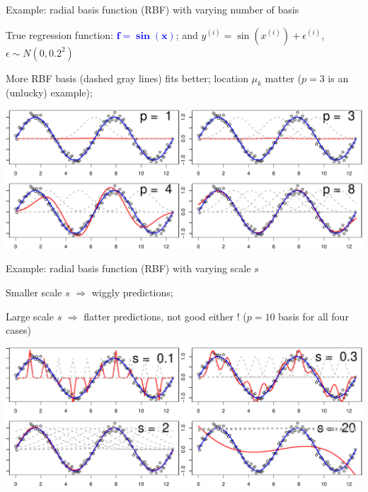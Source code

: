 \documentclass[ignorenonframetext,aspectratio=169]{beamer}
\newcommand{\di}[2]{\ensuremath{ #1^{(#2)}}}
\begin{document}
\begin{frame}{Example: radial basis function (RBF) with varying number
of basis}
\protect\hypertarget{example-radial-basis-function-rbf-with-varying-number-of-basis}{}

True regression function: \textcolor{blue}{$\mathbf{f=\sin(x)}$}; and
\(\di{y}{i}= \sin(\di{x}{i}) + \di{\epsilon}{i}\),
\(\epsilon \sim N(0, 0.2^2)\)

More RBF basis (dashed gray lines) fits better; location \(\mu_k\)
matter (\(p=3\) is an (unlucky) example);

\begin{center}\includegraphics[width=1\linewidth]{lecture10_files/figure-beamer/unnamed-chunk-10-1} \end{center}

\end{frame}

\begin{frame}{Example: radial basis function (RBF) with varying scale
\(s\)}
\protect\hypertarget{example-radial-basis-function-rbf-with-varying-scale-s}{}

Smaller scale \(s\) \(\Rightarrow\) wiggly predictions;

Large scale \(s\) \(\Rightarrow\) flatter predictions, not good either !
(\(p=10\) basis for all four cases)

\begin{center}\includegraphics[width=1\linewidth]{lecture10_files/figure-beamer/unnamed-chunk-11-1} \end{center}

\end{frame}
\end{document}
